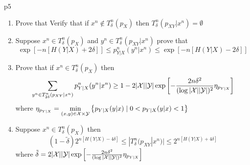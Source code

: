 \documentclass[a4paper, 11pt]{article}
\begin{document}

\begin{problem}{%
	}{p5%
	}
	\begin{enumerate}
		\item Prove that Verify that if $x^n\notin T_{\delta}^n(p_X)$ then $T_{\delta}^n(p_{XY}|x^n)=\emptyset$
		\item Suppose $x^n\in T_{\delta}^n(p_X)$ and $y^n\in T_{\delta}^n(p_{XY}|x^n)$ prove that $$\exp[-n[H(Y|X)+2\delta]]\leq p^n_{Y|X}(y^n|x^n)\leq \exp[{-n[H(Y|X)-2\delta]}]$$
		\item Prove that if $x^n\in T_{\delta}^n(p_{X})$ then $$\sum_{y^n\in T_{2\delta}^n(p_{XY}|x^n)}p_{Y|X}^n(y^n|x^n)\geq 1-2|\mathcal{X}||\mathcal{Y}|\exp\left[ -\frac{2n\delta^2}{(\log |\mathcal{X}||\mathcal{Y}|)^2} \eta_{p_{Y|X}}\right]$$ where $\eta_{p_{Y|X}}=\min\limits_{(x,y)\in \mathcal{X}\times \mathcal{Y}}\left\{ p_{Y|X}(y|x)\mid 0<p_{Y|X}(y|x)<1 \right\}$
		\item Suppose $x^n\in T_{\delta}^n(p_X)$ then $$(1-\tilde{\delta})2^{n[H(Y|X)-4\delta]}\leq |T_{\delta}^n(p_{XY}|x^n)|\leq 2^{n[H(Y|X)+4\delta]}$$ where $\tilde{\delta}=2|\mathcal{X}||\mathcal{Y}|\exp\left[ -\frac{2n\delta^2}{(\log |\mathcal{X}||\mathcal{Y}|)^2} \eta_{p_{Y|X}}\right]$
	\end{enumerate}
\end{problem}
\end{document}
